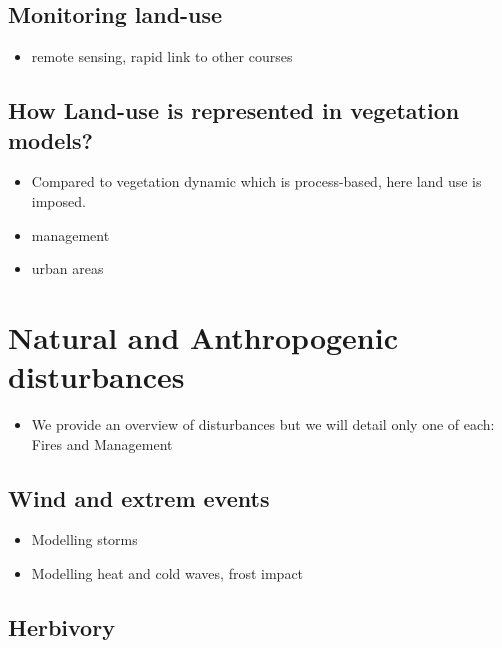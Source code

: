 \documentclass[oneside]{book}
\providecommand{\tightlist}{%
  \setlength{\itemsep}{0pt}\setlength{\parskip}{0pt}}
\begin{document}
\subsection{Monitoring land-use}\label{monitoring-land-use}

\begin{itemize}
\tightlist
\item
  remote sensing, rapid link to other courses
\end{itemize}

\subsection{How Land-use is represented in vegetation
models?}\label{how-land-use-is-represented-in-vegetation-models}

\begin{itemize}
\tightlist
\item
  Compared to vegetation dynamic which is process-based, here land use
  is imposed.
\item
  management
\item
  urban areas
\end{itemize}

\section{Natural and Anthropogenic
disturbances}\label{natural-and-anthropogenic-disturbances}

\begin{itemize}
\tightlist
\item
  We provide an overview of disturbances but we will detail only one of
  each: Fires and Management
\end{itemize}

\subsection{Wind and extrem events}\label{wind-and-extrem-events}

\begin{itemize}
\tightlist
\item
  Modelling storms
\item
  Modelling heat and cold waves, frost impact
\end{itemize}

\subsection{Herbivory}\label{herbivory}
\end{document}
